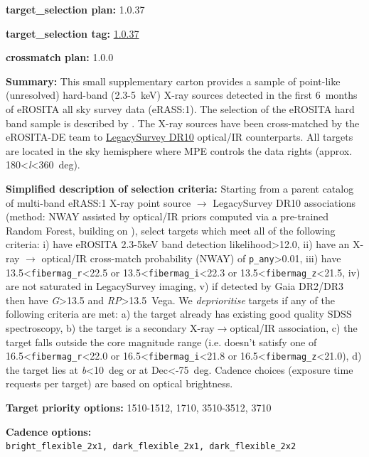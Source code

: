 \noindent\textbf{target\_selection plan:} 1.0.37

\noindent\textbf{target\_selection tag:}
\href{https://github.com/sdss/target_selection/tree/1.0.37/}{1.0.37}

\noindent\textbf{crossmatch plan:} 1.0.0

\noindent\textbf{Summary:} This small supplementary carton provides a sample of
point-like (unresolved) hard-band (2.3-5~keV) X-ray sources detected in
the first 6~months of eROSITA all sky survey data (eRASS:1). The
selection of the eROSITA hard band sample is described by
\citealt{Waddell2026}. The X-ray sources have been cross-matched by the
eROSITA-DE team to
\href{https://www.legacysurvey.org/dr10/}{LegacySurvey DR10} optical/IR
counterparts. All targets are located in the sky hemisphere where MPE
controls the data rights (approx.
180\textless{}\emph{l}\textless360~deg).

\noindent\textbf{Simplified description of selection criteria:} Starting from a
parent catalog of multi-band eRASS:1 X-ray point source $\rightarrow$ LegacySurvey
DR10 associations (method: NWAY assisted by optical/IR priors computed
via a pre-trained Random Forest, building on
\citealt{Salvato2022}), select targets which meet all of the following criteria:
i) have eROSITA 2.3-5keV band detection likelihood\textgreater12.0, ii)
have an X-ray $\rightarrow$ optical/IR cross-match probability (NWAY) of
\texttt{p\_any}\textgreater0.01, iii) have
13.5\textless{}\texttt{fibermag\_r}\textless22.5 or
13.5\textless{}\texttt{fibermag\_i}\textless22.3 or
13.5\textless{}\texttt{fibermag\_z}\textless21.5, iv) are not saturated
in LegacySurvey imaging, v) if detected by Gaia DR2/DR3 then have
\emph{G}\textgreater13.5 and \emph{RP}\textgreater13.5~Vega. We
\emph{deprioritise} targets if any of the following criteria are met: a)
the target already has existing good quality SDSS spectroscopy, b) the
target is a secondary X-ray$\rightarrow$optical/IR association, c) the target falls
outside the core magnitude range (i.e. doesn't satisfy one of
16.5\textless{}\texttt{fibermag\_r}\textless22.0 or
16.5\textless{}\texttt{fibermag\_i}\textless21.8 or
16.5\textless{}\texttt{fibermag\_z}\textless21.0), d) the target lies at
\textbar{}\emph{b}\textbar\textless10~deg or at Dec\textless-75~deg.
Cadence choices (exposure time requests per target) are based on optical
brightness.


\noindent\textbf{Target priority options:} 1510-1512, 1710, 3510-3512, 3710

\noindent\textbf{Cadence options:}
\texttt{bright\_flexible\_2x1,\ dark\_flexible\_2x1,\ dark\_flexible\_2x2}

